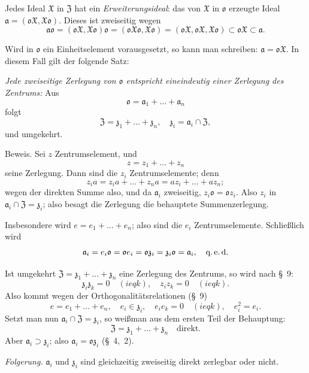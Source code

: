 \documentclass[12pt,a4paper]{article}
\newcommand{\ideala}{\mathfrak{a}}
\theoremstyle{definition}
\begin{document}
Jedes Ideal $\mathfrak{X}$ in $\mathfrak{Z}$ hat ein
\textit{Erweiterungsideal}: das von $\mathfrak{X}$ in $\mathfrak{o}$
erzeugte Ideal $\ideala = (\mathfrak{o}\mathfrak{X}, \mathfrak{X}\mathfrak{o})$.
Dieses ist zweiseitig wegen
\[
\ideala\mathfrak{o} = (\mathfrak{o}\mathfrak{X},
\mathfrak{X}\mathfrak{o})\mathfrak{o}
= (\mathfrak{o}\mathfrak{X}\mathfrak{o}, \mathfrak{X}\mathfrak{o})
= (\mathfrak{o}\mathfrak{X}, \mathfrak{o}\mathfrak{X}, \mathfrak{X}\mathfrak{o})
\subset \mathfrak{o}\mathfrak{X} \subset \ideala.
\]

Wird in $\mathfrak{o}$ ein Einheitselement vorausgesetzt, so kann man
schreiben: $\ideala = \mathfrak{o}\mathfrak{X}$. In diesem Fall gilt der
folgende Satz:

\textit{Jede zweiseitige Zerlegung von $\mathfrak{o}$ entspricht
eineindeutig einer Zerlegung des Zentrums:} Aus
\[
\mathfrak{o} = \mathfrak{a}_1 + \dots + \mathfrak{a}_n
\]
folgt
\[
\mathfrak{Z} = \mathfrak{z}_1 + \dots + \mathfrak{z}_n, \quad
\mathfrak{z}_i = \mathfrak{a}_i \cap \mathfrak{Z},
\]
und umgekehrt.

Beweis. Sei $z$ Zentrumselement, und
\[
z = z_1 + \dots + z_n
\]
seine Zerlegung. Dann sind die $z_i$ Zentrumselemente; denn
\[
z_i a = z_i a + \dots + z_n a = az_i + \dots + az_n;
\]
wegen der direkten Summe also, und da $\mathfrak{a}_i$ zweiseitig,
$z_i\mathfrak{o} = \mathfrak{o}z_i$. Also $z_i$ in
$\mathfrak{a}_i \cap \mathfrak{Z} = \mathfrak{z}_i$; also besagt die
Zerlegung die behauptete Summenzerlegung.

Insbesondere wird $e = e_1 + \dots + e_n$; also sind die $e_i$
Zentrumselemente. Schlie\ss lich wird
\[
\mathfrak{a}_i = e_i\mathfrak{o} = \mathfrak{o}e_i =
\mathfrak{o}\mathfrak{z}_i = \mathfrak{z}_i\mathfrak{o} =
\mathfrak{a}_i, \quad\text{q.\,e.\,d.}
\]

Ist umgekehrt $\mathfrak{Z} = \mathfrak{z}_1 + \dots + \mathfrak{z}_n$
eine Zerlegung des Zentrums, so wird nach \S~9:
\[
\mathfrak{z}_i\mathfrak{z}_k = 0 \quad (i  eq k), \quad
z_i z_k = 0 \quad (i  eq k).
\]
Also kommt wegen der Orthogonalit\"atsrelationen (\S~9)
\[
e = e_1 + \dots + e_n, \quad e_i \in \mathfrak{z}_i, \quad
e_i e_k = 0 \quad (i  eq k), \quad e_i^2 = e_i.
\]
Setzt man nun $\mathfrak{a}_i \cap \mathfrak{Z} = \mathfrak{z}_i$, so
wei\ss man aus dem ersten Teil der Behauptung:
\[
\mathfrak{Z} = \mathfrak{z}_1 + \dots + \mathfrak{z}_n \quad\text{direkt.}
\]
Aber $\mathfrak{a}_i \supset \mathfrak{z}_i$; also
$\mathfrak{a}_i = \mathfrak{o}\mathfrak{z}_i$ (\S~4,~2).

\textit{Folgerung.} $\mathfrak{a}_i$ und $\mathfrak{z}_i$ sind
gleichzeitig zweiseitig direkt zerlegbar oder nicht.
\end{document}
